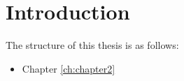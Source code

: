 \chapter{Introduction}
\label{ch:introduction}

The structure of this thesis is as follows:
\begin{itemize}
    \item Chapter \ref{ch:chapter2} 
\end{itemize}